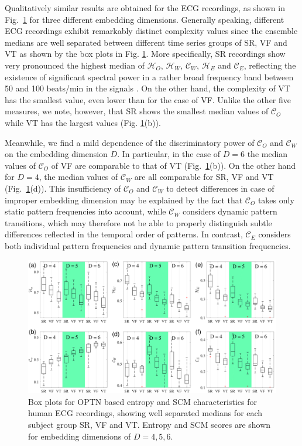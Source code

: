 \documentclass[aip,cha,reprint,nofootinbib]{revtex4-1}
\begin{document}
Qualitatively similar results are obtained for the ECG recordings, as shown in Fig.~\ref{fig:ecg} for three different embedding dimensions. Generally speaking, different ECG recordings exhibit remarkably distinct complexity values since the ensemble medians are well separated between different time series groups of SR, VF and VT as shown by the box plots in Fig. \ref{fig:ecg}. More specifically, SR recordings show very pronounced the highest median of $\mathcal{H}_O$, $\mathcal{H}_W$, $\mathcal{C}_W$, $\mathcal{H}_E$ and $\mathcal{C}_E$, reflecting the existence of significant spectral power in a rather broad frequency band between 50 and 100 beats/min in the signals \cite{smallCSF2002}. On the other hand, the complexity of VT has the smallest value, even lower than for the case of VF. Unlike the other five measures, we note, however, that SR shows the smallest median values of $\mathcal{C}_O$ while VT has the largest values (Fig. \ref{fig:ecg}(b)). 

 {\color{red}Meanwhile, we find a mild dependence of the discriminatory power of $\mathcal{C}_O$ and $\mathcal{C}_W$ on the embedding dimension $D$. In particular, in the case of $D=6$ the median values of $\mathcal{C}_O$ of VF are comparable to that of VT (Fig.~\ref{fig:ecg}(b)). On the other hand for $D=4$, the median values of $\mathcal{C}_W$ are all comparable for SR, VF and VT (Fig.~\ref{fig:ecg}(d)). This insufficiency of $\mathcal{C}_O$ and $\mathcal{C}_W$ to detect differences in case of improper embedding dimension may be explained by the fact that $\mathcal{C}_O$ takes only static pattern frequencies into account, while $\mathcal{C}_W$ considers dynamic pattern transitions, which may therefore not be able to properly distinguish subtle differences reflected in the temporal order of patterns. In contrast, $\mathcal{C}_E$ considers both individual pattern frequencies and dynamic pattern transition frequencies. } 
\begin{figure}
	\centering 
	\includegraphics[width=2\columnwidth]{ecgExample.pdf}
\caption{\color{red}\small{Box plots for OPTN based entropy and SCM characteristics for human ECG recordings, showing well separated medians for each subject group SR, VF and VT. Entropy and SCM scores are shown for embedding dimensions of $D = 4, 5, 6$. } \label{fig:ecg}}
\end{figure}
\end{document}
